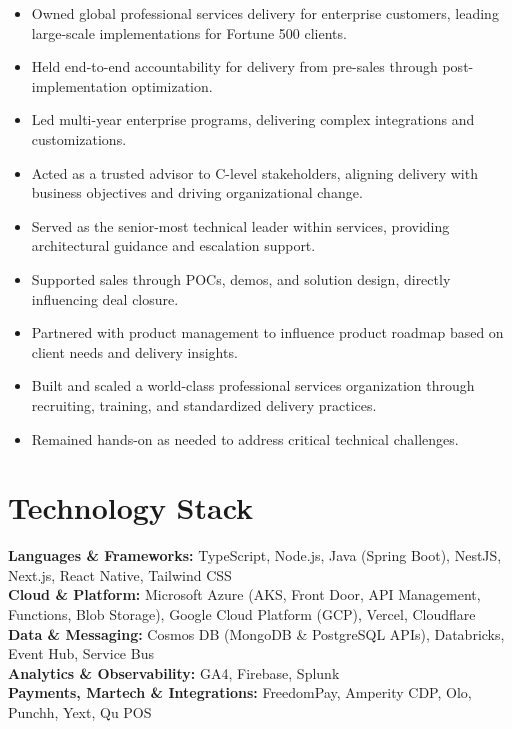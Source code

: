 \documentclass[11pt]{article}
\begin{document}
\begin{itemize}
  \item Owned global professional services delivery for enterprise customers, leading large-scale implementations for Fortune 500 clients.
  \item Held end-to-end accountability for delivery from pre-sales through post-implementation optimization.
  \item Led multi-year enterprise programs, delivering complex integrations and customizations.
  \item Acted as a trusted advisor to C-level stakeholders, aligning delivery with business objectives and driving organizational change.
  \item Served as the senior-most technical leader within services, providing architectural guidance and escalation support.
  \item Supported sales through POCs, demos, and solution design, directly influencing deal closure.
  \item Partnered with product management to influence product roadmap based on client needs and delivery insights.
  \item Built and scaled a world-class professional services organization through recruiting, training, and standardized delivery practices.
  \item Remained hands-on as needed to address critical technical challenges.
\end{itemize}

\section*{Technology Stack}
\textbf{Languages \& Frameworks:} TypeScript, Node.js, Java (Spring Boot), NestJS, Next.js, React Native, Tailwind CSS \\
\textbf{Cloud \& Platform:} Microsoft Azure (AKS, Front Door, API Management, Functions, Blob Storage), Google Cloud Platform (GCP), Vercel, Cloudflare \\
\textbf{Data \& Messaging:} Cosmos DB (MongoDB \& PostgreSQL APIs), Databricks, Event Hub, Service Bus \\
\textbf{Analytics \& Observability:} GA4, Firebase, Splunk \\
\textbf{Payments, Martech \& Integrations:} FreedomPay, Amperity CDP, Olo, Punchh, Yext, Qu POS

\end{document}
